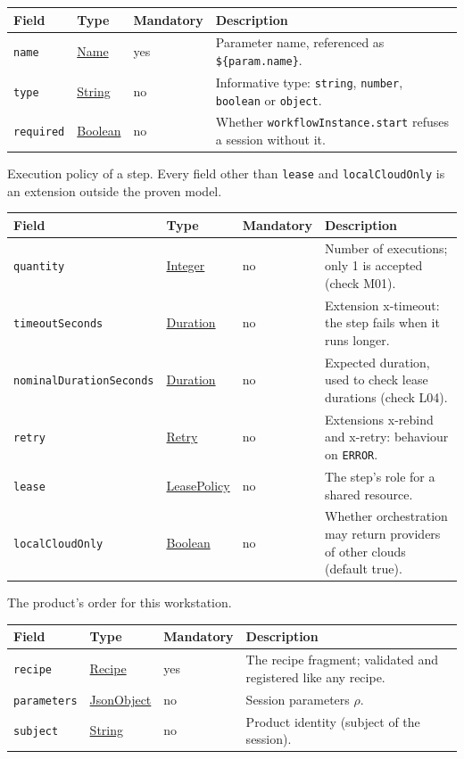 \documentclass[a4paper]{arrowhead}
\newcommand{\mref}[1]{{\textcolor{ArrowheadPurple}{\hyperref[sec:model:#1]{#1}}}}
\newcommand{\pref}[1]{{\textcolor{ArrowheadGrey}{\hyperref[sec:model:primitives:#1]{#1}}}}
\begin{document}
{\small
\begin{longtable}{|p{3.7cm}|p{4.2cm}|p{1.6cm}|p{6.3cm}|}

\hline
\rowcolor{gray!33} Field & Type & Mandatory & Description \\ \hline
\endhead
\texttt{name} & \pref{Name} & yes & Parameter name, referenced as \texttt{\$\{param.name\}}. \\ \hline
\texttt{type} & \pref{String} & no & Informative type: \texttt{string}, \texttt{number}, \texttt{boolean} or \texttt{object}. \\ \hline
\texttt{required} & \pref{Boolean} & no & Whether \texttt{workflow\allowbreak{}Instance.\allowbreak{}start} refuses a session without it. \\ \hline
\end{longtable}
}

Execution policy of a step. Every field other than \texttt{lease} and \texttt{local\allowbreak{}Cloud\allowbreak{}Only} is an extension outside the proven model.

{\small
\begin{longtable}{|p{3.7cm}|p{4.2cm}|p{1.6cm}|p{6.3cm}|}

\hline
\rowcolor{gray!33} Field & Type & Mandatory & Description \\ \hline
\endhead
\texttt{quantity} & \pref{Integer} & no & Number of executions; only 1 is accepted (check M01). \\ \hline
\texttt{timeout\allowbreak{}Seconds} & \pref{Duration} & no & Extension x-timeout: the step fails when it runs longer. \\ \hline
\texttt{nominal\allowbreak{}Duration\allowbreak{}Seconds} & \pref{Duration} & no & Expected duration, used to check lease durations (check L04). \\ \hline
\texttt{retry} & \mref{Retry} & no & Extensions x-rebind and x-retry: behaviour on \texttt{ERROR}. \\ \hline
\texttt{lease} & \mref{LeasePolicy} & no & The step's role for a shared resource. \\ \hline
\texttt{local\allowbreak{}Cloud\allowbreak{}Only} & \pref{Boolean} & no & Whether orchestration may return providers of other clouds (default true). \\ \hline
\end{longtable}
}

The product's order for this workstation.

{\small
\begin{longtable}{|p{3.7cm}|p{4.2cm}|p{1.6cm}|p{6.3cm}|}

\hline
\rowcolor{gray!33} Field & Type & Mandatory & Description \\ \hline
\endhead
\texttt{recipe} & \mref{Recipe} & yes & The recipe fragment; validated and registered like any recipe. \\ \hline
\texttt{parameters} & \pref{JsonObject} & no & Session parameters $\rho$. \\ \hline
\texttt{subject} & \pref{String} & no & Product identity (subject of the session). \\ \hline
\end{longtable}
}
\end{document}
